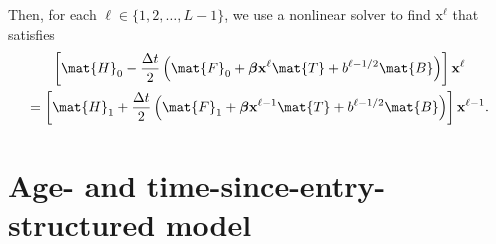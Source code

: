 \documentclass{jpmarticle}
\renewcommand{\vec}[1]{\boldsymbol{\mathrm{#1}}}
\begin{document}
Then, for each $\ell \in \{1, 2, \ldots, L - 1\}$,
we use a nonlinear solver to find $\vec{x}^{\ell}$ that satisfies
\begin{multline}
  \left[
    \mat{H}_0
    - \frac{\Delta t}{2}
    \left(
      \mat{F}_0
      + \vec{\beta} \vec{x}^{\ell} \mat{T}
      + b^{\ell - 1 / 2} \mat{B}
    \right)
  \right] \vec{x}^{\ell}
  \\
  = \left[
    \mat{H}_1
    + \frac{\Delta t}{2}
    \left(
      \mat{F}_1
      + \vec{\beta} \vec{x}^{\ell - 1} \mat{T}
      + b^{\ell - 1 / 2} \mat{B}
    \right)
  \right] \vec{x}^{\ell - 1}.
\end{multline}


\section{Age- and time-since-entry-structured model}
\end{document}
